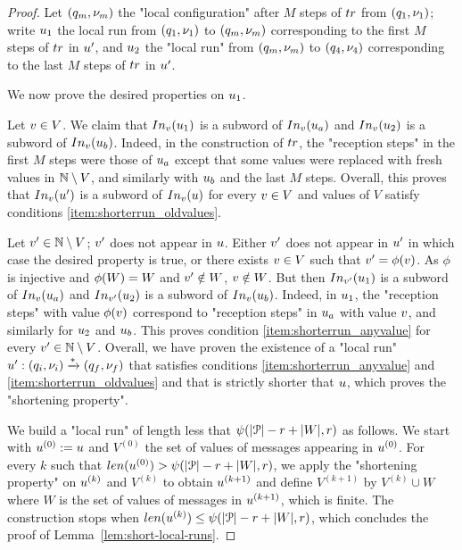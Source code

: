 \begin{proof}
	Let $(q_m, \nu_m)$ the "local configuration" after $M$ steps of $\atrace$ from $(q_1, \nu_1)$; write $u_1$ the local run from $(q_1,\nu_1)$ to $(q_m, \nu_m)$ corresponding to the first $M$ steps of $\atrace$ in $u'$, and $u_2$ the "local run" from $(q_m, \nu_m)$ to $(q_4, \nu_4)$ corresponding to the last $M$ steps of $\atrace$ in $u'$.  
	
	We now prove the desired properties on $u_{1}$.
	
	Let $v \in V$. We claim that $\vinput{\aval}{\localrun_{1}}$ is a subword of $\vinput{\aval}{\localrun_a}$ and $\vinput{\aval}{\localrun_{2}}$ is a subword of $\vinput{\aval}{\localrun_b}$. Indeed, in the construction of $\atrace$, the "reception steps" in the first $M$ steps were those of $u_a$ except that some values were replaced with fresh values in $\mathbb{N} \setminus V$, and similarly with $u_b$ and the last $M$ steps. Overall, this proves that $\vinput{\aval}{\localrun'}$ is a subword of $\vinput{\aval}{\localrun}$ for every $v \in V$ and values of $V$ satisfy conditions \ref{item:shorterrun_oldvalues}. 
	
	Let $v' \in \mathbb{N} \setminus V$; $v'$ does not appear in $u$. Either $v'$ does not appear in $u'$ in which case the desired property is true, or there exists $v \in V$ such that $v' = \phi(v)$. As $\phi$ is injective and $\phi(W) = W$ and $v'\notin W$, $v \notin W$. 
	But then $\vinput{\aval'}{\localrun_{1}}$ is a subword of $\vinput{\aval}{\localrun_a}$ and $\vinput{\aval'}{\localrun_{2}}$ is a subword of $\vinput{\aval}{\localrun_b}$. Indeed, in $u_1$, the "reception steps" with value $\phi(v)$ correspond to "reception steps" in $u_a$ with value $v$, and similarly for $u_2$ and $u_b$. This proves condition \ref{item:shorterrun_anyvalue} for every $v' \in \mathbb{N} \setminus V$.
	Overall, we have proven the existence of a "local run" $u': (q_i,\nu_i) \xrightarrow{*} (q_f,\nu_f)$ that satisfies conditions \ref{item:shorterrun_anyvalue} and \ref{item:shorterrun_oldvalues} and that is strictly shorter that $u$, which proves the "shortening property".
	
	We build a "local run" of length less that $\psi(|\mathcal{P}|-r+|W|,r)$ as follows. We start with $u^{(0)} := u$ and $V^{(0)}$ the set of values of messages appearing in $u^{(0)}$. For every $k$ such that $\length{\localrun^{(0)}} > \towerfun(\size{\prot}-r+\size{\Vinit},\regnum)$, we apply the "shortening property" on $u^{(k)}$ and $V^{(k)}$ to obtain $u^{(k+1)}$ and define $V^{(k+1)}$ by $V^{(k)} \cup W$ where $W$ is the set of values of messages in $u^{(k+1)}$, which is finite.
	The construction stops when $\length{\localrun^{(k)}} \leq \towerfun(\size{\prot}-r + \size{\Vinit},\regnum)$, which concludes the proof of Lemma~\ref{lem:short-local-runs}. 
\end{proof}

